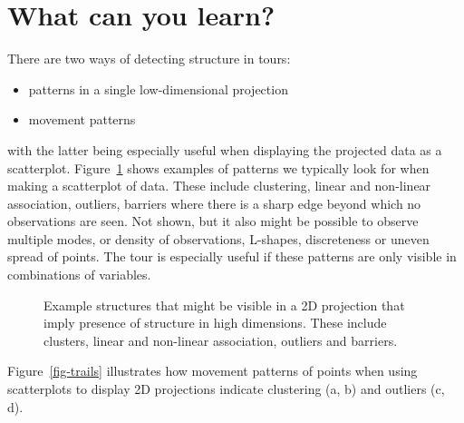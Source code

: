 \documentclass[
  letterpaper,
]{krantz}
\providecommand{\tightlist}{%
  \setlength{\itemsep}{0pt}\setlength{\parskip}{0pt}}\usepackage{longtable,booktabs,array}
\begin{document}
\section{What can you learn?}\label{what-can-you-learn}

There are two ways of detecting structure in tours:

\begin{itemize}
\tightlist
\item
  patterns in a single low-dimensional projection
\item
  movement patterns
\end{itemize}

with the latter being especially useful when displaying the projected
data as a scatterplot. Figure~\ref{fig-example-structure} shows examples
of patterns we typically look for when making a scatterplot of data.
These include clustering, linear and non-linear association, outliers,
barriers where there is a sharp edge beyond which no observations are
seen. Not shown, but it also might be possible to observe multiple
modes, or density of observations, L-shapes, discreteness or uneven
spread of points. The tour is especially useful if these patterns are
only visible in combinations of variables.

\begin{figure}


\caption{\label{fig-example-structure}Example structures that might be
visible in a 2D projection that imply presence of structure in high
dimensions. These include clusters, linear and non-linear association,
outliers and barriers.}

\end{figure}%

Figure~\ref{fig-trails} illustrates how movement patterns of points when
using scatterplots to display 2D projections indicate clustering (a, b)
and outliers (c, d).
\end{document}
